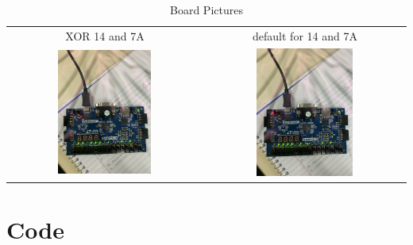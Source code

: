 \documentclass[11pt]{article}
\newcommand{\Verilog}[2][]{%
	
}
\begin{document}
\begin{table}[h]\centering
	\begin{tabular}{cc}
		XOR 14 and 7A & default for 14 and 7A \\
		\includegraphics [width=0.5\textwidth,trim=0 0 0 0, clip, angle = 270]{XOR} &
		\includegraphics [width=0.5\textwidth,trim=0 0 0 0, clip, angle = 270]{default} \\
	\end{tabular}
	\caption{Board Pictures}
	\label{fig:sim_with_table}
\end{table}


\section*{Code}

\Verilog{Lab09/systemverilog/register.sv}

\Verilog{Lab09/systemverilog/register_test.sv}

\Verilog{Lab09/systemverilog/alu.sv}

\Verilog{Lab09/systemverilog/alu_test.sv}

\Verilog{Lab09/systemverilog/top_lab9.sv}
\end{document}
